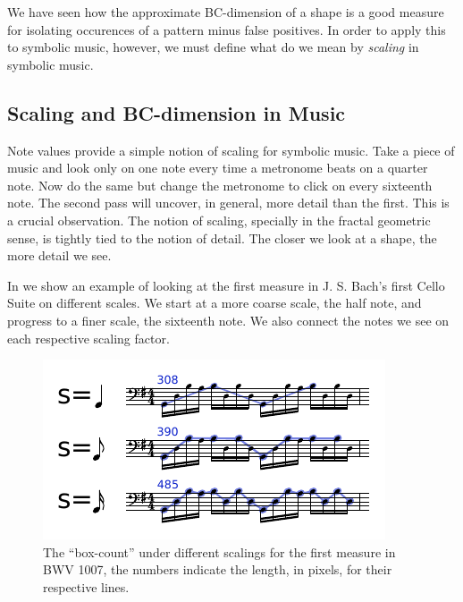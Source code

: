   We have seen how the approximate BC-dimension of a shape is a good
measure for isolating occurences of a pattern minus false positives.
In order to apply this to symbolic music, however, we must define what
do we mean by \emph{scaling} in symbolic music.

\subsection{Scaling and BC-dimension in Music} 
  Note values provide a simple notion of scaling for symbolic music.
Take a piece of music and look only on one note every time a metronome
beats on a quarter note. Now do the same but change the metronome to
click on every sixteenth note. The second pass will uncover, in general,
more detail than the first. This is a crucial observation. The notion
of scaling, specially in the fractal geometric sense, is tightly tied
to the notion of detail. The closer we look at a shape, the more detail we see.

  In  we show an example of looking at the first
measure in J. S. Bach's first Cello Suite on different scales. We start at 
a more coarse scale, the half note, and progress to a finer scale, the sixteenth note.
We also connect the notes we see on each respective scaling factor.

\begin{figure}
  \includegraphics[width=\linewidth]{src/img/musical-scaling-example.pdf}
  \caption{The ``box-count'' under different scalings for the first measure in BWV 1007,
the numbers indicate the length, in pixels, for their respective lines.}
  \label{fig:egscalingmusic}
\end{figure}


